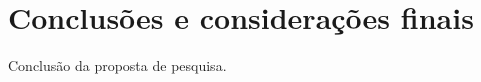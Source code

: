 \documentclass[12pt,a4paper]{article}
\begin{document}
\section{Conclusões e considerações finais}
Conclusão da proposta de pesquisa.

\newpage


\end{document}
